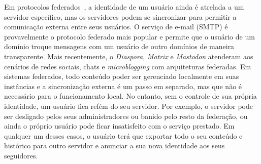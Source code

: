 \documentclass[12pt]{article}
\newcommand{\FC} {Freechains\xspace}
\begin{document}

Em protocolos federados~\cite{TODO}, a identidade de um usuário ainda é
atrelada a um servidor específico, mas os servidores podem se sincronizar para
permitir a comunicação externa entre seus usuários.
O serviço de e-mail (SMTP) é provavelmente o protocolo federado mais popular e
permite que o usuário de um domínio troque mensagens com um usuário de outro
domínios de maneira transparente.
Mais recentemente, o \emph{Diaspora}, \emph{Matrix} e \emph{Mastodon} atenderam
aos cenários de redes sociais, chats e \emph{microblogging} com arquiteturas
federadas.
Em sistemas federados, todo conteúdo poder ser gerenciado localmente em suas
instâncias e a sincronização externa é um passo em separado, mas que não é
necessário para o funcionamento local.
No entanto, sem o controle de sua própria identidade, um usuário fica refém do
seu servidor.
Por exemplo, o servidor pode ser desligado pelos seus administradores ou banido
pelo resto da federação, ou ainda o próprio usuário pode ficar insatisfeito com
o serviço prestado.
Em qualquer um desses casos, o usuário terá que exportar todo o seu conteúdo e
histórico para outro servidor e anunciar a sua nova identidade aos seus
seguidores.
\end{document}
